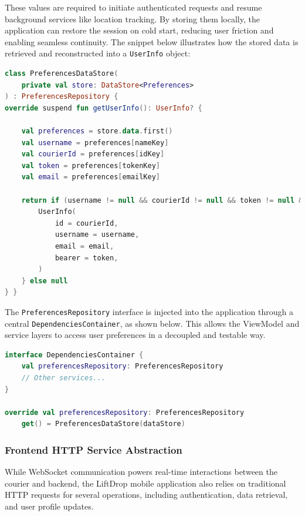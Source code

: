 These values are required to initiate authenticated requests and resume background services like location tracking. By storing them locally, the application can restore the session on cold start, reducing user friction and enabling seamless continuity.
The snippet below illustrates how the stored data is retrieved and reconstructed into a \texttt{UserInfo} object:


\begin{lstlisting}[language=Kotlin, caption={Retrieving stored user data from PreferencesDataStore}]
class PreferencesDataStore(
    private val store: DataStore<Preferences>
) : PreferencesRepository {
override suspend fun getUserInfo(): UserInfo? {

    val preferences = store.data.first()
    val username = preferences[nameKey]
    val courierId = preferences[idKey]
    val token = preferences[tokenKey]
    val email = preferences[emailKey]
    
    return if (username != null && courierId != null && token != null && email != null) {
        UserInfo(
            id = courierId,
            username = username,
            email = email,
            bearer = token,
        )
    } else null
} }
\end{lstlisting}

The \texttt{PreferencesRepository} interface is injected into the application through a central \texttt{DependenciesContainer}, as shown below. This allows the ViewModel and service layers to access user preferences in a decoupled and testable way.


\begin{lstlisting}[language=Kotlin, caption={Injecting PreferencesDataStore via DependenciesContainer}]
interface DependenciesContainer {
    val preferencesRepository: PreferencesRepository
    // Other services...
}

override val preferencesRepository: PreferencesRepository
    get() = PreferencesDataStore(dataStore)
\end{lstlisting}

\subsubsection{Frontend HTTP Service Abstraction}

While WebSocket communication powers real-time interactions between the courier and backend, the LiftDrop mobile application also relies on traditional HTTP requests for several operations, including authentication, data retrieval, and user profile updates.


